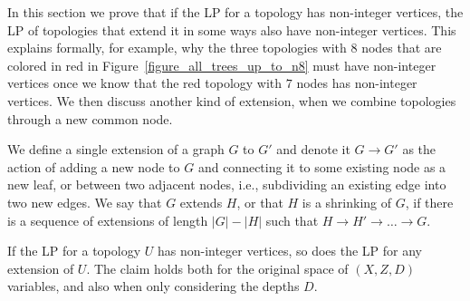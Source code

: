 In this section we prove that if the LP for a topology has non-integer vertices, the LP of topologies that extend it in some ways also have non-integer vertices. This explains formally, for example, why the three topologies with $8$ nodes that are colored in red in Figure~\ref{figure_all_trees_up_to_n8} must have non-integer vertices once we know that the red topology with $7$ nodes has non-integer vertices. We then discuss another kind of extension, when we combine topologies through a new common node.

\begin{definition}
\label{definition_extended_graph}
We define a single extension of a graph $G$ to $G'$ and denote it $G \to G'$ as the action of adding a new node to $G$ and connecting it to some existing node as a new leaf, or between two adjacent nodes, i.e., subdividing an existing edge into two new edges.
We say that $G$ extends $H$, or that $H$ is a shrinking of $G$, if there is a sequence of extensions of length $|G|-|H|$ such that $H \to H' \to \ldots \to G$.
\end{definition}

\begin{theorem}
\label{theorem_subgraph_with_frac_vertex_implies_frac_vertex_extension}
If the LP for a topology $U$ has non-integer vertices, so does the LP for any extension of $U$. The claim holds both for the original space of $(X,Z,D)$ variables, and also when only considering the depths $D$.
\end{theorem}


